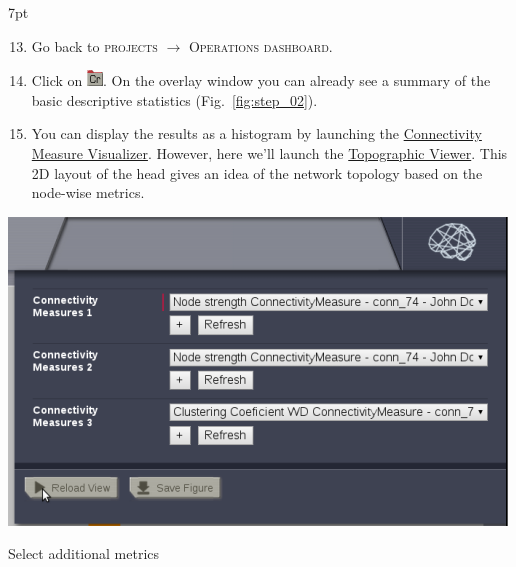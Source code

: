 \documentclass{tufte-handout}
\newenvironment{formal}{%
  \def\FrameCommand{%
    \hspace{1pt}%
    {\color{DarkBlue}\vrule width 2pt}%
    {\color{formalshade}\vrule width 4pt}%
    \colorbox{formalshade}%
  }%
  \MakeFramed{\advance\hsize-\width\FrameRestore}%
  \noindent\hspace{-4.55pt}%
  \begin{adjustwidth}{}{7pt}%
  \vspace{2pt}\vspace{2pt}%
}
{%
  \vspace{2pt}\end{adjustwidth}\endMakeFramed%
}
\begin{document}
\begin{formal}
  \begin{enumerate}[resume]
  \setcounter{enumi}{12}
  \item Go back to \textsc{projects} $\rightarrow$ \textsc{Operations dashboard}.
  \item Click on \includegraphics[width=0.042\linewidth]{nodeConnectivityMeasure}. On
  the overlay window you can already see a summary of the basic descriptive
  statistics (Fig.~\ref{fig:step_02}).
  \item You can display the results as a histogram by launching the \underline{Connectivity Measure Visualizer}. However, here we'll launch the \underline{Topographic Viewer}. This 2D layout of the
head gives an idea of the network topology based on the node-wise
metrics. 
  \end{enumerate}
\end{formal}


\newpage
\begin{marginfigure}
  \includegraphics[width=\linewidth]{Handout_UI_ModellingStructuralLesions_AnalysisView}%
  \caption{Select additional metrics}%
  \label{fig:step_05}%
\end{marginfigure}
\end{document}
